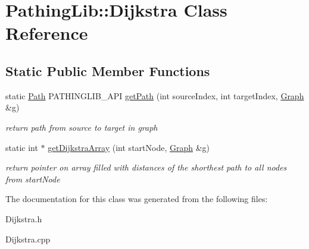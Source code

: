\hypertarget{class_pathing_lib_1_1_dijkstra}{}\section{Pathing\+Lib\+:\+:Dijkstra Class Reference}
\label{class_pathing_lib_1_1_dijkstra}
\subsection*{Static Public Member Functions}
\begin{DoxyCompactItemize}
\item 
static \hyperlink{class_pathing_lib_1_1_path}{Path} P\+A\+T\+H\+I\+N\+G\+L\+I\+B\+\_\+\+A\+PI \hyperlink{class_pathing_lib_1_1_dijkstra_ac1315598da52573baf7b3999a373402a}{get\+Path} (int source\+Index, int target\+Index, \hyperlink{class_pathing_lib_1_1_graph}{Graph} \&g)\hypertarget{class_pathing_lib_1_1_dijkstra_ac1315598da52573baf7b3999a373402a}{}\label{class_pathing_lib_1_1_dijkstra_ac1315598da52573baf7b3999a373402a}

\begin{DoxyCompactList}\small\item\em return path from source to target in graph \end{DoxyCompactList}\item 
static int $\ast$ \hyperlink{class_pathing_lib_1_1_dijkstra_a4aaeeaece10f1c50a6609f6ca1c248e1}{get\+Dijkstra\+Array} (int start\+Node, \hyperlink{class_pathing_lib_1_1_graph}{Graph} \&g)\hypertarget{class_pathing_lib_1_1_dijkstra_a4aaeeaece10f1c50a6609f6ca1c248e1}{}\label{class_pathing_lib_1_1_dijkstra_a4aaeeaece10f1c50a6609f6ca1c248e1}

\begin{DoxyCompactList}\small\item\em return pointer on array filled with distances of the shorthest path to all nodes from start\+Node \end{DoxyCompactList}\end{DoxyCompactItemize}


The documentation for this class was generated from the following files\+:\begin{DoxyCompactItemize}
\item 
Dijkstra.\+h\item 
Dijkstra.\+cpp\end{DoxyCompactItemize}
